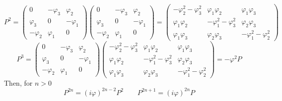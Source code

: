 \documentclass{article}
\begin{document}
\begin{equation}
    P^2 = \begin{pmatrix}
        0 & -\varphi_3 & \varphi_2 \\
        \varphi_3 & 0 & -\varphi_1 \\
        -\varphi_2 & \varphi_1 & 0
    \end{pmatrix}\begin{pmatrix}
        0 & -\varphi_3 & \varphi_2 \\
        \varphi_3 & 0 & -\varphi_1 \\
        -\varphi_2 & \varphi_1 & 0
    \end{pmatrix}
    = \begin{pmatrix}
        -\varphi_2^2 - \varphi_3^2 & \varphi_1\varphi_2 & \varphi_1\varphi_3 \\ \varphi_1\varphi_2 & -\varphi_1^2 - \varphi_3^2 & \varphi_2\varphi_3 \\ \varphi_1\varphi_3 & \varphi_2\varphi_3 & -\varphi_1^2 - \varphi_2^2
    \end{pmatrix}
\end{equation}
\begin{equation}
    P^3 = \begin{pmatrix}
        0 & -\varphi_3 & \varphi_2 \\
        \varphi_3 & 0 & -\varphi_1 \\
        -\varphi_2 & \varphi_1 & 0
    \end{pmatrix} \begin{pmatrix}
        -\varphi_2^2 - \varphi_3^2 & \varphi_1\varphi_2 & \varphi_1\varphi_3 \\ \varphi_1\varphi_2 & -\varphi_1^2 - \varphi_3^2 & \varphi_2\varphi_3 \\ \varphi_1\varphi_3 & \varphi_2\varphi_3 & -\varphi_1^2 - \varphi_2^2
    \end{pmatrix} = -\varphi^2 P
\end{equation}
Then, for $n > 0$
\begin{equation}
    P^{2n} = (i\varphi)^{2n-2} P^{2} \qquad P^{2n+1} = (i\varphi)^{2n}P
\end{equation}
\end{document}
